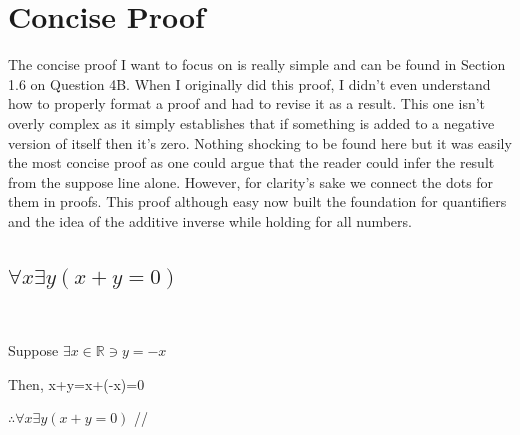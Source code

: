 \documentclass{article}
\begin{document}
\newpage
\section{Concise Proof}
\justifying
The concise proof I want to focus on is really simple and can be found in Section 1.6 on Question 4B. When I originally did this proof, I didn't even understand how to properly format a proof and had to revise it as a result. This one isn't overly complex as it simply establishes that if something is added to a negative version of itself then it's zero. Nothing shocking to be found here but it was easily the most concise proof as one could argue that the reader could infer the result from the suppose line alone. However, for clarity's sake we connect the dots for them in proofs. This proof although easy now built the foundation for quantifiers and the idea of the additive inverse while holding for all numbers.

\subsection{$ \forall x \exists y (x+y=0) $}
\
\begin{center}
\raggedright

Suppose $\exists x \in \mathbb{R} \ni y=-x$

Then, x+y=x+(-x)=0

$\therefore \forall x \exists y (x+y=0) $ //
\end{center}



\newpage
\end{document}
